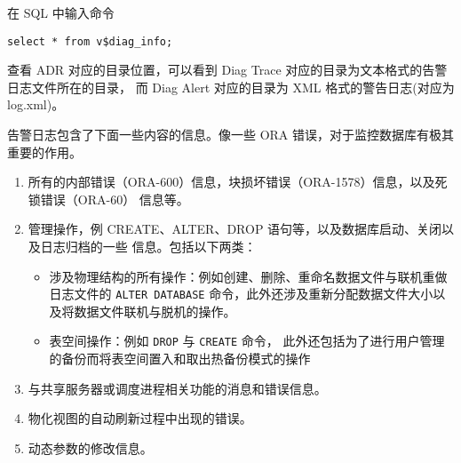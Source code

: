 在 SQL 中输入命令
\begin{verbatim}
select * from v$diag_info;
\end{verbatim}
查看 ADR 对应的目录位置，可以看到 Diag Trace 对应的目录为文本格式的告警日志文件所在的目录，
而 Diag Alert 对应的目录为 XML 格式的警告日志(对应为 log.xml)。

告警日志包含了下面一些内容的信息。像一些 ORA 错误，对于监控数据库有极其重要的作用。
\begin{enumerate}
  \item 所有的内部错误（ORA-600）信息，块损坏错误（ORA-1578）信息，以及死锁错误（ORA-60）
    信息等。
  \item 管理操作，例 CREATE、ALTER、DROP 语句等，以及数据库启动、关闭以及日志归档的一些
    信息。包括以下两类：
    \begin{itemize}
      \item 涉及物理结构的所有操作：例如创建、删除、重命名数据文件与联机重做日志文件的
        \texttt{ALTER DATABASE} 命令，此外还涉及重新分配数据文件大小以及将数据文件联机与脱机的操作。
      \item 表空间操作：例如 \texttt{DROP} 与 \texttt{CREATE} 命令，
        此外还包括为了进行用户管理的备份而将表空间置入和取出热备份模式的操作
    \end{itemize}
  \item 与共享服务器或调度进程相关功能的消息和错误信息。
  \item 物化视图的自动刷新过程中出现的错误。
  \item 动态参数的修改信息。
\end{enumerate}

